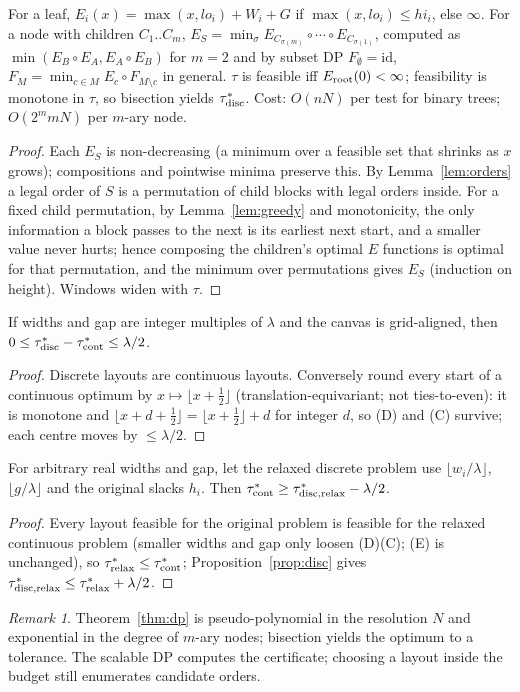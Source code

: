 \documentclass[11pt]{article}
\theoremstyle{remark}\newtheorem{remark}{Remark}
\begin{document}
\begin{theorem}[Exact DP]\label{thm:dp}
For a leaf, $E_i(x)=\max(x,lo_i)+W_i+G$ if $\max(x,lo_i)\le hi_i$, else $\infty$. For a node with children $C_1..C_m$, $E_S=\min_\sigma E_{C_{\sigma(m)}}\circ\cdots\circ E_{C_{\sigma(1)}}$, computed as $\min(E_B\circ E_A,E_A\circ E_B)$ for $m=2$ and by subset DP $F_\emptyset=\mathrm{id}$, $F_M=\min_{c\in M}E_c\circ F_{M\setminus c}$ in general. $\tau$ is feasible iff $E_{\rm root}(0)<\infty$; feasibility is monotone in $\tau$, so bisection yields $\tau^*_{\rm disc}$. Cost: $O(nN)$ per test for binary trees; $O(2^m mN)$ per $m$-ary node.
\end{theorem}
\begin{proof}Each $E_S$ is non-decreasing (a minimum over a feasible set that shrinks as $x$ grows); compositions and pointwise minima preserve this. By Lemma~\ref{lem:orders} a legal order of $S$ is a permutation of child blocks with legal orders inside. For a fixed child permutation, by Lemma~\ref{lem:greedy} and monotonicity, the only information a block passes to the next is its earliest next start, and a smaller value never hurts; hence composing the children's optimal $E$ functions is optimal for that permutation, and the minimum over permutations gives $E_S$ (induction on height). Windows widen with $\tau$.\end{proof}

\begin{proposition}[Discretisation]\label{prop:disc}If widths and gap are integer multiples of $\lambda$ and the canvas is grid-aligned, then $0\le\tau^*_{\rm disc}-\tau^*_{\rm cont}\le\lambda/2$.\end{proposition}
\begin{proof}Discrete layouts are continuous layouts. Conversely round every start of a continuous optimum by $x\mapsto\lfloor x+\tfrac12\rfloor$ (translation-equivariant; not ties-to-even): it is monotone and $\lfloor x+d+\tfrac12\rfloor=\lfloor x+\tfrac12\rfloor+d$ for integer $d$, so (D) and (C) survive; each centre moves by $\le\lambda/2$.\end{proof}

\begin{proposition}\label{prop:lb}For arbitrary real widths and gap, let the relaxed discrete problem use $\lfloor w_i/\lambda\rfloor$, $\lfloor g/\lambda\rfloor$ and the original slacks $h_i$. Then $\tau^*_{\rm cont}\ge\tau^*_{\rm disc,relax}-\lambda/2$.\end{proposition}
\begin{proof}Every layout feasible for the original problem is feasible for the relaxed continuous problem (smaller widths and gap only loosen (D)(C); (E) is unchanged), so $\tau^*_{\rm relax}\le\tau^*_{\rm cont}$; Proposition~\ref{prop:disc} gives $\tau^*_{\rm disc,relax}\le\tau^*_{\rm relax}+\lambda/2$.\end{proof}
\begin{remark}Theorem~\ref{thm:dp} is pseudo-polynomial in the resolution $N$ and exponential in the degree of $m$-ary nodes; bisection yields the optimum to a tolerance. The scalable DP computes the certificate; choosing a layout inside the budget still enumerates candidate orders.\end{remark}
\end{document}

